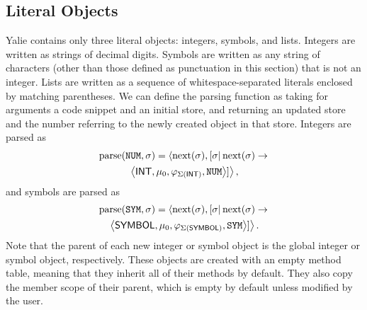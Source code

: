 \documentclass[twocolumn]{article}
\begin{document}
\subsection*{Literal Objects}
Yalie contains only three literal objects: integers, symbols, and
lists. Integers are written as strings of decimal digits. Symbols are
written as any string of characters (other than those defined as
punctuation in this section) that is not an integer. Lists are written
as a sequence of whitespace-separated literals enclosed by matching
parentheses. We can define the parsing function as taking for
arguments a code snippet and an initial store, and returning an
updated store and the number referring to the newly created object in
that store.  Integers are parsed as
\begin{multline*}
\operatorname{parse}(\texttt{NUM},\sigma) =
\left<\operatorname{next}(\sigma),[\sigma|\operatorname{next}(\sigma) \rightarrow\right. \\
\left.\left<\mathsf{INT}, \mu_0, \varphi_{\Sigma(\mathsf{INT})}, \texttt{NUM}\right>]\right>,
\end{multline*}
and symbols are parsed as
\begin{multline*}
  \operatorname{parse}(\texttt{SYM},\sigma) =
  \left<\operatorname{next}(\sigma),[\sigma|\operatorname{next}(\sigma) \rightarrow\right. \\
\left.\left<\mathsf{SYMBOL}, \mu_0, \varphi_{\Sigma(\mathsf{SYMBOL})},
  \texttt{SYM}\right>]\right>.
\end{multline*}
Note that the parent of each new integer or symbol object is the
global integer or symbol object, respectively. These objects are
created with an empty method table, meaning that they inherit all of
their methods by default. They also copy the member scope of their
parent, which is empty by default unless modified by the user.
\end{document}
